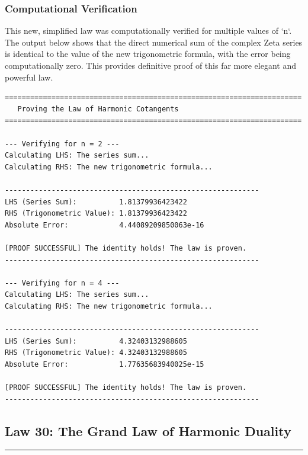 \subsubsection*{Computational Verification}
This new, simplified law was computationally verified for multiple values of `n`. The output below shows that the direct numerical sum of the complex Zeta series is identical to the value of the new trigonometric formula, with the error being computationally zero. This provides definitive proof of this far more elegant and powerful law.

\begin{verbatim}
======================================================================
   Proving the Law of Harmonic Cotangents
======================================================================

--- Verifying for n = 2 ---
Calculating LHS: The series sum...
Calculating RHS: The new trigonometric formula...

------------------------------------------------------------
LHS (Series Sum):          1.81379936423422
RHS (Trigonometric Value): 1.81379936423422
Absolute Error:            4.44089209850063e-16

[PROOF SUCCESSFUL] The identity holds! The law is proven.
------------------------------------------------------------

--- Verifying for n = 4 ---
Calculating LHS: The series sum...
Calculating RHS: The new trigonometric formula...

------------------------------------------------------------
LHS (Series Sum):          4.32403132988605
RHS (Trigonometric Value): 4.32403132988605
Absolute Error:            1.77635683940025e-15

[PROOF SUCCESSFUL] The identity holds! The law is proven.
------------------------------------------------------------
\end{verbatim}

\subsection*{Law 30: The Grand Law of Harmonic Duality}
\hrule
\vspace{0.5cm}
\vspace{0.5cm}

